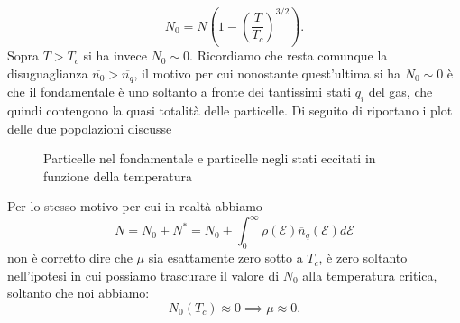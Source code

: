 %
\[
	N_0 = N\left( 1 -\left( \frac{T}{T_{c}} \right)^{3 /2}
 \right) 
.\] 
Sopra $T>T_{c}$ si ha invece $N_0 \sim 0$. Ricordiamo che resta comunque la disuguaglianza $\overline{n_0}>\overline{n_{q}}$, il motivo per cui nonostante quest'ultima si ha $N_0 \sim 0$ è che il fondamentale è uno soltanto a fronte dei tantissimi stati $q_{i}$ del gas, che quindi contengono la quasi totalità delle particelle. Di seguito di riportano i plot delle due popolazioni discusse
\begin{figure}[H]
    \centering
    \caption{Particelle nel fondamentale e particelle negli stati eccitati in funzione della temperatura}
    \label{fig:particelle-nel-fondamentale-e-particelle-negli-stati-eccitati-in-funzione-della-temperatura}
\end{figure}
\noindent
Per lo stesso motivo per cui in realtà abbiamo 
\[
	N = N_0 + N^{*}= N_0 + 
	\int_{0}^{\infty} 
	\rho ( \mathcal{E} )\overline{n}_{q}( \mathcal{E} ) 
	d\mathcal{E} 
\]
non è corretto dire che $\mu $ sia esattamente zero sotto a $T_{c}$, è zero soltanto nell'ipotesi in cui possiamo trascurare il valore di $N_0$ alla temperatura critica, soltanto che noi abbiamo:
\[
	N_0( T_{c}) \approx 0 \implies \mu \approx 0
.\] 
